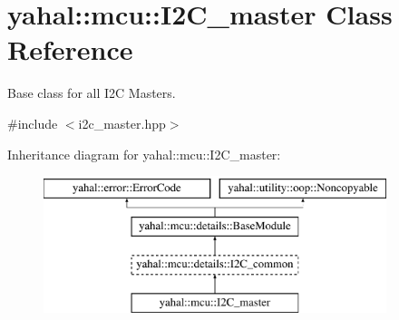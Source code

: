 \hypertarget{classyahal_1_1mcu_1_1_i2_c__master}{}\section{yahal\+:\+:mcu\+:\+:I2\+C\+\_\+master Class Reference}
\label{classyahal_1_1mcu_1_1_i2_c__master}


Base class for all I2\+C Masters.  




{\ttfamily \#include $<$i2c\+\_\+master.\+hpp$>$}

Inheritance diagram for yahal\+:\+:mcu\+:\+:I2\+C\+\_\+master\+:\begin{figure}[H]
\begin{center}
\leavevmode
\includegraphics[height=4.000000cm]{classyahal_1_1mcu_1_1_i2_c__master}
\end{center}
\end{figure}
